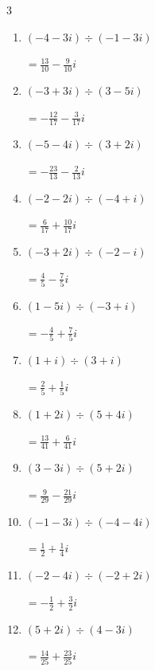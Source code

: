\begin{multicols}{3}
\begin{enumerate}
  \item $\displaystyle (-4-3i)\div(-1-3i)$

        $\displaystyle =\frac{13}{10}-\frac{9}{10}i$

  \item $\displaystyle (-3+3i)\div(3-5i)$

        $\displaystyle =-\frac{12}{17}-\frac{3}{17}i$

  \item $\displaystyle (-5-4i)\div(3+2i)$

        $\displaystyle =-\frac{23}{13}-\frac{2}{13}i$

\columnbreak %

  \item $\displaystyle (-2-2i)\div(-4+i)$

        $\displaystyle =\frac{6}{17}+\frac{10}{17}i$

  \item $\displaystyle (-3+2i)\div(-2-i)$

        $\displaystyle =\frac{4}{5}-\frac{7}{5}i$

  \item $\displaystyle (1-5i)\div(-3+i)$

        $\displaystyle =-\frac{4}{5}+\frac{7}{5}i$

  \item $\displaystyle (1+i)\div(3+i)$

        $\displaystyle =\frac{2}{5}+\frac{1}{5}i$

  \item $\displaystyle (1+2i)\div(5+4i)$

        $\displaystyle =\frac{13}{41}+\frac{6}{41}i$

  \item $\displaystyle (3-3i)\div(5+2i)$

        $\displaystyle =\frac{9}{29}-\frac{21}{29}i$

  \item $\displaystyle (-1-3i)\div(-4-4i)$

        $\displaystyle =\frac{1}{2}+\frac{1}{4}i$

  \item $\displaystyle (-2-4i)\div(-2+2i)$

        $\displaystyle =-\frac{1}{2}+\frac{3}{2}i$

  \item $\displaystyle (5+2i)\div(4-3i)$

        $\displaystyle =\frac{14}{25}+\frac{23}{25}i$


\end{enumerate}
\end{multicols}
